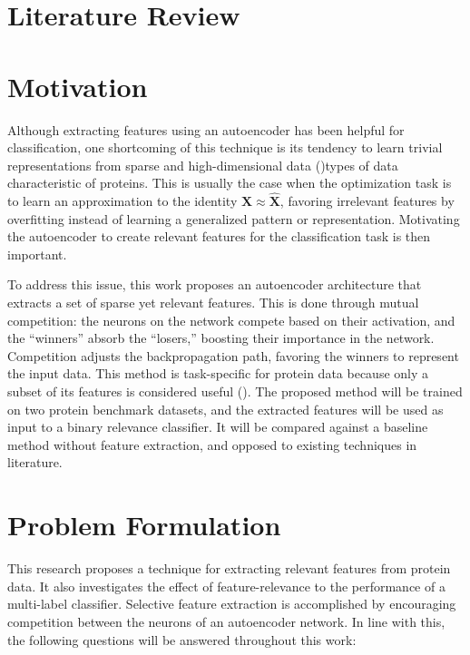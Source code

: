 \section{Literature Review}
\label{LiteratureReview}

\section{Motivation}
\label{Motivation}

\par Although extracting features using an autoencoder has been helpful for
classification, one shortcoming of this technique is its tendency to learn
trivial representations from sparse and high-dimensional data
(\cite{wang2017feature, chen2017kate})\textemdash types of data characteristic
of proteins. This is usually the case when the optimization task is to learn
an approximation to the identity $\mathbf{X} \approx \mathbf{\widehat{X}}$,
favoring irrelevant features by overfitting instead of learning a generalized
pattern or representation. Motivating the autoencoder to create relevant features
for the classification task is then important.

\par To address this issue, this work proposes an autoencoder architecture that
extracts a set of sparse yet relevant features. This is done through mutual
competition: the neurons on the network compete based on their activation, and
the ``winners'' absorb the ``losers,'' boosting their importance in the network.
Competition adjusts the backpropagation path, favoring the winners to represent
the input data. This method is task-specific for protein data because only a subset
of its features is considered useful (\cite{iqbal2014efficient, gaudet2017gene}).
The proposed method will be trained on two protein benchmark datasets, and the
extracted features will be used as input to a binary relevance classifier. It will
be compared against a baseline method without feature extraction, and opposed to
existing techniques in literature.

\section{Problem Formulation}
\label{Problem}

\par This research proposes a technique for extracting relevant features from
protein data. It also investigates the effect of feature-relevance to the
performance of a multi-label classifier. Selective feature extraction is
accomplished by encouraging competition between the neurons of an
autoencoder network. In line with this, the following questions will be
answered throughout this work:


